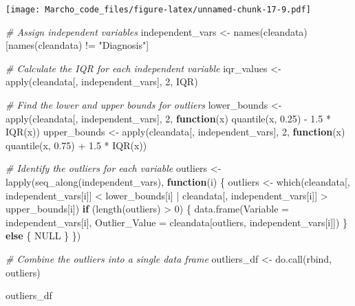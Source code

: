 \documentclass[
]{article}
\newenvironment{Shaded}{\begin{snugshade}}{\end{snugshade}}
\newcommand{\AttributeTok}[1]{\textcolor[rgb]{0.77,0.63,0.00}{#1}}
\newcommand{\CommentTok}[1]{\textcolor[rgb]{0.56,0.35,0.01}{\textit{#1}}}
\newcommand{\ConstantTok}[1]{\textcolor[rgb]{0.00,0.00,0.00}{#1}}
\newcommand{\ControlFlowTok}[1]{\textcolor[rgb]{0.13,0.29,0.53}{\textbf{#1}}}
\newcommand{\DecValTok}[1]{\textcolor[rgb]{0.00,0.00,0.81}{#1}}
\newcommand{\FloatTok}[1]{\textcolor[rgb]{0.00,0.00,0.81}{#1}}
\newcommand{\FunctionTok}[1]{\textcolor[rgb]{0.00,0.00,0.00}{#1}}
\newcommand{\NormalTok}[1]{#1}
\newcommand{\OtherTok}[1]{\textcolor[rgb]{0.56,0.35,0.01}{#1}}
\newcommand{\SpecialCharTok}[1]{\textcolor[rgb]{0.00,0.00,0.00}{#1}}
\newcommand{\StringTok}[1]{\textcolor[rgb]{0.31,0.60,0.02}{#1}}
\begin{document}
\texttt{[image: Marcho\_code\_files/figure-latex/unnamed-chunk-17-9.pdf]}

\begin{Shaded}
\begin{Highlighting}[]
\CommentTok{\# Assign independent variables}
\NormalTok{independent\_vars }\OtherTok{\textless{}{-}} \FunctionTok{names}\NormalTok{(cleandata)[}\FunctionTok{names}\NormalTok{(cleandata) }\SpecialCharTok{!=} \StringTok{"Diagnosis"}\NormalTok{]}

\CommentTok{\# Calculate the IQR for each independent variable}
\NormalTok{iqr\_values }\OtherTok{\textless{}{-}} \FunctionTok{apply}\NormalTok{(cleandata[, independent\_vars], }\DecValTok{2}\NormalTok{, IQR)}

\CommentTok{\# Find the lower and upper bounds for outliers}
\NormalTok{lower\_bounds }\OtherTok{\textless{}{-}} \FunctionTok{apply}\NormalTok{(cleandata[, independent\_vars], }\DecValTok{2}\NormalTok{, }\ControlFlowTok{function}\NormalTok{(x) }\FunctionTok{quantile}\NormalTok{(x, }\FloatTok{0.25}\NormalTok{) }\SpecialCharTok{{-}} \FloatTok{1.5} \SpecialCharTok{*} \FunctionTok{IQR}\NormalTok{(x))}
\NormalTok{upper\_bounds }\OtherTok{\textless{}{-}} \FunctionTok{apply}\NormalTok{(cleandata[, independent\_vars], }\DecValTok{2}\NormalTok{, }\ControlFlowTok{function}\NormalTok{(x) }\FunctionTok{quantile}\NormalTok{(x, }\FloatTok{0.75}\NormalTok{) }\SpecialCharTok{+} \FloatTok{1.5} \SpecialCharTok{*} \FunctionTok{IQR}\NormalTok{(x))}

\CommentTok{\# Identify the outliers for each variable}
\NormalTok{outliers }\OtherTok{\textless{}{-}} \FunctionTok{lapply}\NormalTok{(}\FunctionTok{seq\_along}\NormalTok{(independent\_vars), }\ControlFlowTok{function}\NormalTok{(i) \{}
\NormalTok{  outliers }\OtherTok{\textless{}{-}} \FunctionTok{which}\NormalTok{(cleandata[, independent\_vars[i]] }\SpecialCharTok{\textless{}}\NormalTok{ lower\_bounds[i] }\SpecialCharTok{|}\NormalTok{ cleandata[, independent\_vars[i]] }\SpecialCharTok{\textgreater{}}\NormalTok{ upper\_bounds[i])}
  \ControlFlowTok{if}\NormalTok{ (}\FunctionTok{length}\NormalTok{(outliers) }\SpecialCharTok{\textgreater{}} \DecValTok{0}\NormalTok{) \{}
    \FunctionTok{data.frame}\NormalTok{(}\AttributeTok{Variable =}\NormalTok{ independent\_vars[i], }\AttributeTok{Outlier\_Value =}\NormalTok{ cleandata[outliers, independent\_vars[i]])}
\NormalTok{  \} }\ControlFlowTok{else}\NormalTok{ \{}
    \ConstantTok{NULL}
\NormalTok{  \}}
\NormalTok{\})}

\CommentTok{\# Combine the outliers into a single data frame}
\NormalTok{outliers\_df }\OtherTok{\textless{}{-}} \FunctionTok{do.call}\NormalTok{(rbind, outliers)}

\NormalTok{outliers\_df}
\end{Highlighting}
\end{Shaded}
\end{document}
